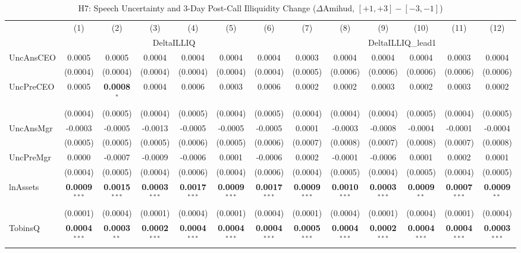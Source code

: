\documentclass[11pt,a4paper]{article}
\begin{document}
\begin{table}[htbp]
\centering
\caption{H7: Speech Uncertainty and 3-Day Post-Call Illiquidity Change ($\Delta$Amihud, $[+1,+3]-[-3,-1]$)}
\label{tab:h7}
\scriptsize
\begin{tabular}{lcccccccccccc}
\toprule
 & (1) & (2) & (3) & (4) & (5) & (6) & (7) & (8) & (9) & (10) & (11) & (12) \\
 & \multicolumn{6}{c}{DeltaILLIQ} & \multicolumn{6}{c}{DeltaILLIQ\_lead1} \\
\cmidrule(lr){2-7} \cmidrule(lr){8-13}
\midrule
UncAnsCEO & 0.0005 & 0.0005 & 0.0004 & 0.0004 & 0.0004 & 0.0004 & 0.0003 & 0.0004 & 0.0004 & 0.0004 & 0.0003 & 0.0004 \\
 & (0.0004) & (0.0004) & (0.0004) & (0.0004) & (0.0004) & (0.0004) & (0.0005) & (0.0006) & (0.0006) & (0.0006) & (0.0006) & (0.0006) \\
UncPreCEO & 0.0005 & \textbf{0.0008}$^{*}$ & 0.0004 & 0.0006 & 0.0003 & 0.0006 & 0.0002 & 0.0002 & 0.0003 & 0.0002 & 0.0003 & 0.0002 \\
 & (0.0004) & (0.0005) & (0.0004) & (0.0005) & (0.0004) & (0.0005) & (0.0004) & (0.0004) & (0.0004) & (0.0005) & (0.0004) & (0.0005) \\
UncAnsMgr & -0.0003 & -0.0005 & -0.0013 & -0.0005 & -0.0005 & -0.0005 & 0.0001 & -0.0003 & -0.0008 & -0.0004 & -0.0001 & -0.0004 \\
 & (0.0005) & (0.0005) & (0.0005) & (0.0006) & (0.0005) & (0.0006) & (0.0007) & (0.0008) & (0.0007) & (0.0008) & (0.0007) & (0.0008) \\
UncPreMgr & 0.0000 & -0.0007 & -0.0009 & -0.0006 & 0.0001 & -0.0006 & 0.0002 & -0.0001 & -0.0006 & 0.0001 & 0.0002 & 0.0001 \\
 & (0.0004) & (0.0005) & (0.0004) & (0.0006) & (0.0004) & (0.0006) & (0.0004) & (0.0005) & (0.0004) & (0.0005) & (0.0004) & (0.0005) \\
\midrule
lnAssets & \textbf{0.0009}$^{***}$ & \textbf{0.0015}$^{***}$ & \textbf{0.0003}$^{***}$ & \textbf{0.0017}$^{***}$ & \textbf{0.0009}$^{***}$ & \textbf{0.0017}$^{***}$ & \textbf{0.0009}$^{***}$ & \textbf{0.0010}$^{***}$ & \textbf{0.0003}$^{***}$ & \textbf{0.0009}$^{**}$ & \textbf{0.0007}$^{***}$ & \textbf{0.0009}$^{**}$ \\
 & (0.0001) & (0.0004) & (0.0001) & (0.0004) & (0.0001) & (0.0004) & (0.0001) & (0.0004) & (0.0001) & (0.0004) & (0.0001) & (0.0004) \\
TobinsQ & \textbf{0.0004}$^{***}$ & \textbf{0.0003}$^{**}$ & \textbf{0.0002}$^{***}$ & \textbf{0.0004}$^{***}$ & \textbf{0.0004}$^{***}$ & \textbf{0.0004}$^{***}$ & \textbf{0.0005}$^{***}$ & \textbf{0.0004}$^{***}$ & \textbf{0.0002}$^{***}$ & \textbf{0.0004}$^{***}$ & \textbf{0.0004}$^{***}$ & \textbf{0.0003}$^{***}$ \\

\end{tabular}
\end{table}
\end{document}
